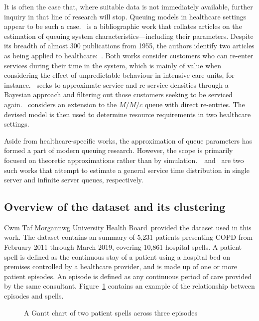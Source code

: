 \documentclass[]{interact}
\newlength{\imgwidth}
\theoremstyle{plain}%
\theoremstyle{definition}
\theoremstyle{remark}
\newcommand{\ctmuhb}{Cwm Taf Morgannwg University Health Board}
\begin{document}
It is often the case that, where suitable data is not immediately available,
further inquiry in that line of research will stop. Queuing models in healthcare
settings appear to be such a case.~\cite{Asanjarani2017} is a bibliographic work
that collates articles on the estimation of queuing system
characteristics---including their parameters. Despite its breadth of almost 300
publications from 1955, the authors identify two articles as being applied
to healthcare:~\cite{Mohammadi2012,Yom2014}. Both works consider customers who
can re-enter services during their time in the system, which is mainly of value
when considering the effect of unpredictable behaviour in intensive care units,
for instance.~\cite{Mohammadi2012} seeks to approximate service and re-service
densities through a Bayesian approach and filtering out those customers seeking
to be serviced again.~\cite{Yom2014} considers an extension to the \(M/M/c\)
queue with direct re-entries. The devised model is then used to determine
resource requirements in two healthcare settings.

Aside from healthcare-specific works, the approximation of queue parameters has
formed a part of modern queuing research. However, the scope is
primarily focused on theoretic approximations rather than by
simulation.~\cite{Djabali2018}~and~\cite{Goldenshluger2016} are two such works
that attempt to estimate a general service time distribution in single server
and infinite server queues, respectively.

\subsection{Overview of the dataset and its clustering}\label{subsec:overview}

\ctmuhb\ provided the dataset used in this work. The dataset contains an
summary of 5,231 patients presenting COPD from February 2011 through March 2019,
covering 10,861 hospital spells. A patient spell is defined as the continuous
stay of a patient using a hospital bed on premises controlled by a healthcare
provider, and is made up of one or more patient episodes. An episode is defined
as any continuous period of care provided by the same consultant.
Figure~\ref{fig:spell} contains an example of the relationship between episodes
and spells.

\begin{figure}
    \centering
    \resizebox{\imgwidth}{!}{}
    \caption{A Gantt chart of two patient spells across three episodes}
    \label{fig:spell}
\end{figure}
\end{document}
